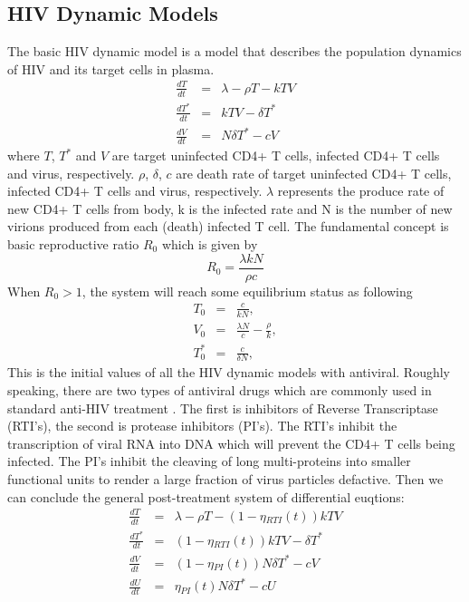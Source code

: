 \documentclass[12pt]{extarticle}
\begin{document}
\subsection{HIV Dynamic Models}
\label{sect:hiv}
The basic HIV dynamic model is a model that describes the population dynamics of HIV and its target cells in plasma.
\begin{equation}
\begin{array}{rcl}
\frac{dT}{dt} & = & \lambda{}-\rho{}T-kTV \\
\frac{dT^{*}}{dt} & = & kTV-\delta{}T^{*} \\
\frac{dV}{dt} & = & N\delta{}T^{*}-cV
\end{array}
\end{equation}
where $T$, $T^{*}$ and $V$ are target uninfected CD4+ T cells, infected CD4+ T cells and virus, respectively.  $\rho$, $\delta$, $c$ are death rate of target uninfected CD4+ T cells, infected CD4+ T cells and virus, respectively. $\lambda$ represents the produce rate of new CD4+ T cells from body, k is the infected rate and N is the number of new virions produced from each (death) infected T cell.
The fundamental concept is basic reproductive ratio $R_{0}$ \cite{Putter02} which is given by
\begin{equation}
R_{0}=\frac{\lambda{}kN}{\rho{}c}
\end{equation}
When $R_{0}>1$, the system will reach some equilibrium status as following
\begin{equation}
\begin{array}{rcl}
T_{0} & = & \frac{c}{kN}, \\
V_{0} & = & \frac{\lambda{}N}{c}-\frac{\rho}{k}, \\
T_{0}^{*} & = & \frac{c}{\delta{}N}, 
\end{array}
\end{equation}
This is the initial values of all the HIV dynamic models with antiviral. Roughly speaking, there are two types of antiviral drugs which are commonly used in standard anti-HIV treatment \cite{Putter02}. The first is inhibitors of Reverse Transcriptase (RTI's), the second is protease inhibitors (PI's). The RTI's inhibit the transcription of viral RNA into DNA which will prevent the CD4+ T cells being infected. The PI's inhibit the cleaving of long multi-proteins into smaller functional units to render a large fraction of virus particles defactive. Then we can conclude the general post-treatment system of differential euqtions:
\begin{equation}
\begin{array}{rcl}
\frac{dT}{dt} & = & \lambda{}-\rho{}T-(1-\eta{}_{RTI}(t))kTV \\
\frac{dT^{*}}{dt} & = & (1-\eta{}_{RTI}(t))kTV-\delta{}T^{*} \\
\frac{dV}{dt} & = & (1-\eta{}_{PI}(t))N\delta{}T^{*}-cV \\
\frac{dU}{dt} & = & \eta{}_{PI}(t)N\delta{}T^{*}-cU \label{generalmodel}
\end{array}
\end{equation}
\end{document}
